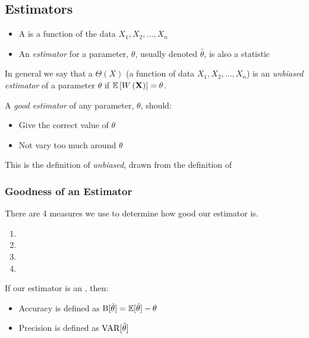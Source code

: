 	\subsection{Estimators} \label{subsec:Estimators}
		\begin{itemize}[noitemsep, nolistsep]
			\item A  is a function of the data $X_{1},X_{2},\ldots,X_{n}$
			\item An \emph{estimator} for a parameter, $\theta$, usually denoted $\hat{\theta}$, is also a statistic
		\end{itemize}
		\begin{definition} \label{def:Unbiased Estimator}
			In general we say that a  $\Theta (X)$ (a function of data $X_{1},X_{2},\ldots,X_{n}$) is an \emph{unbiased estimator} of a parameter $\theta$ if $\operatorname{\operatorname{\mathbb{E}}} \left[ W \left( \mathbf{X} \right) \right] = \theta$.
			\begin{remark}
				A \emph{good estimator} of any parameter, $\theta$, should:
				\begin{itemize}[noitemsep, nolistsep]
					\item Give the correct value of $\theta$
					\item Not vary too much around $\theta$
				\end{itemize}
			\end{remark}
			\begin{remark}
				This is the definition of \emph{unbiased}, drawn from the definition of 
			\end{remark}
		\end{definition}
	
		\subsubsection{Goodness of an Estimator} \label{subsubsec:Estimator Goodness}
		There are 4 measures we use to determine how good our estimator is.
			\begin{enumerate}
				\item {}
				\item {}
				\item {}
				\item {}
			\end{enumerate}
		If our estimator is an , then:
			\begin{itemize}
				\item Accuracy is defined as $\operatorname{\operatorname{B}} [\hat{\theta} ] = \operatorname{\operatorname{\mathbb{E}}} [\hat{\theta}] - \theta$
				\item Precision is defined as $\operatorname{\operatorname{VAR}} [\hat{\theta}]$
			\end{itemize}
		
